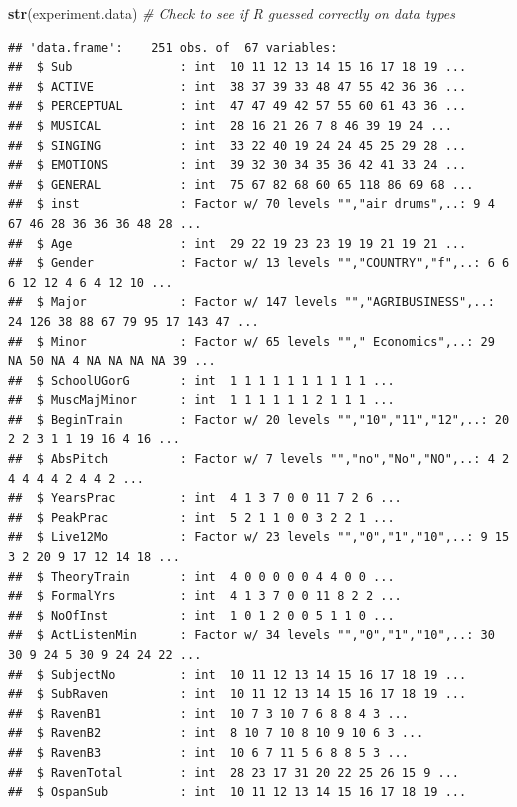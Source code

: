 \documentclass[]{book}
\newenvironment{Shaded}{\begin{snugshade}}{\end{snugshade}}
\newcommand{\KeywordTok}[1]{\textcolor[rgb]{0.13,0.29,0.53}{\textbf{#1}}}
\newcommand{\CommentTok}[1]{\textcolor[rgb]{0.56,0.35,0.01}{\textit{#1}}}
\newcommand{\NormalTok}[1]{#1}
\theoremstyle{definition}
\theoremstyle{definition}
\theoremstyle{definition}
\theoremstyle{remark}
\begin{document}
\begin{Shaded}
\begin{Highlighting}[]
\KeywordTok{str}\NormalTok{(experiment.data) }\CommentTok{# Check to see if R guessed correctly on data types}
\end{Highlighting}
\end{Shaded}

\begin{verbatim}
## 'data.frame':    251 obs. of  67 variables:
##  $ Sub               : int  10 11 12 13 14 15 16 17 18 19 ...
##  $ ACTIVE            : int  38 37 39 33 48 47 55 42 36 36 ...
##  $ PERCEPTUAL        : int  47 47 49 42 57 55 60 61 43 36 ...
##  $ MUSICAL           : int  28 16 21 26 7 8 46 39 19 24 ...
##  $ SINGING           : int  33 22 40 19 24 24 45 25 29 28 ...
##  $ EMOTIONS          : int  39 32 30 34 35 36 42 41 33 24 ...
##  $ GENERAL           : int  75 67 82 68 60 65 118 86 69 68 ...
##  $ inst              : Factor w/ 70 levels "","air drums",..: 9 4 67 46 28 36 36 36 48 28 ...
##  $ Age               : int  29 22 19 23 23 19 19 21 19 21 ...
##  $ Gender            : Factor w/ 13 levels "","COUNTRY","f",..: 6 6 6 12 12 4 6 4 12 10 ...
##  $ Major             : Factor w/ 147 levels "","AGRIBUSINESS",..: 24 126 38 88 67 79 95 17 143 47 ...
##  $ Minor             : Factor w/ 65 levels ""," Economics",..: 29 NA 50 NA 4 NA NA NA NA 39 ...
##  $ SchoolUGorG       : int  1 1 1 1 1 1 1 1 1 1 ...
##  $ MuscMajMinor      : int  1 1 1 1 1 1 2 1 1 1 ...
##  $ BeginTrain        : Factor w/ 20 levels "","10","11","12",..: 20 2 2 3 1 1 19 16 4 16 ...
##  $ AbsPitch          : Factor w/ 7 levels "","no","No","NO",..: 4 2 4 4 4 4 2 4 4 2 ...
##  $ YearsPrac         : int  4 1 3 7 0 0 11 7 2 6 ...
##  $ PeakPrac          : int  5 2 1 1 0 0 3 2 2 1 ...
##  $ Live12Mo          : Factor w/ 23 levels "","0","1","10",..: 9 15 3 2 20 9 17 12 14 18 ...
##  $ TheoryTrain       : int  4 0 0 0 0 0 4 4 0 0 ...
##  $ FormalYrs         : int  4 1 3 7 0 0 11 8 2 2 ...
##  $ NoOfInst          : int  1 0 1 2 0 0 5 1 1 0 ...
##  $ ActListenMin      : Factor w/ 34 levels "","0","1","10",..: 30 30 9 24 5 30 9 24 24 22 ...
##  $ SubjectNo         : int  10 11 12 13 14 15 16 17 18 19 ...
##  $ SubRaven          : int  10 11 12 13 14 15 16 17 18 19 ...
##  $ RavenB1           : int  10 7 3 10 7 6 8 8 4 3 ...
##  $ RavenB2           : int  8 10 7 10 8 10 9 10 6 3 ...
##  $ RavenB3           : int  10 6 7 11 5 6 8 8 5 3 ...
##  $ RavenTotal        : int  28 23 17 31 20 22 25 26 15 9 ...
##  $ OspanSub          : int  10 11 12 13 14 15 16 17 18 19 ...

\end{verbatim}
\end{document}
